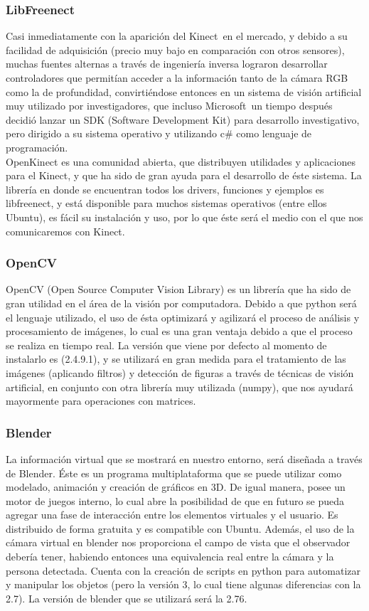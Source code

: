 \documentclass[a4paper,openright,12pt]{report}
\begin{document}
\subsubsection{LibFreenect}
Casi inmediatamente con la aparición del Kinect\textcopyright\ en el mercado, y debido a su facilidad de adquisición (precio muy bajo en comparación con otros sensores), muchas fuentes alternas a través de ingeniería inversa lograron desarrollar controladores que permitían acceder a la información tanto de la cámara RGB como la de profundidad, convirtiéndose entonces en un sistema de visión artificial muy utilizado por investigadores, que incluso Microsoft\textregistered\ un tiempo después decidió lanzar un SDK (Software Development Kit) para desarrollo investigativo, pero dirigido a su sistema operativo y utilizando c\# como lenguaje de programación.\\
OpenKinect es una comunidad abierta, que distribuyen utilidades y aplicaciones para el Kinect\textcopyright, y que ha sido de gran ayuda para el desarrollo de éste sistema. La librería en donde se encuentran todos los drivers, funciones y ejemplos es libfreenect, y está disponible para muchos sistemas operativos (entre ellos Ubuntu), es fácil su instalación y uso, por lo que éste será el medio con el que nos comunicaremos con Kinect\textcopyright.
\subsubsection{OpenCV}
OpenCV (Open Source Computer Vision Library) es un librería que ha sido de gran utilidad en el área de la visión por computadora. Debido a que python será el lenguaje utilizado, el uso de ésta optimizará y agilizará el proceso de análisis y procesamiento de imágenes, lo cual es una gran ventaja debido a que el proceso se realiza en tiempo real. La versión que viene por defecto al momento de instalarlo es (2.4.9.1), y se utilizará en gran medida para el tratamiento de las imágenes (aplicando filtros) y detección de figuras a través de técnicas de visión artificial, en conjunto con otra librería muy utilizada (numpy), que nos ayudará mayormente para operaciones con matrices.
\subsubsection{Blender}
La información virtual que se mostrará en nuestro entorno, será diseñada a través de Blender. Éste es un programa multiplataforma que se puede utilizar como modelado, animación y creación de gráficos en 3D. De igual manera, posee un motor de juegos interno, lo cual abre la posibilidad de que en futuro se pueda agregar una fase de interacción entre los elementos virtuales y el usuario. Es distribuido de forma gratuita y es compatible con Ubuntu. Además, el uso de la cámara virtual en blender nos proporciona el campo de vista que el observador debería tener, habiendo entonces una equivalencia real entre la cámara y la persona detectada. Cuenta con la creación de scripts en python para automatizar y manipular los objetos (pero la versión 3, lo cual tiene algunas diferencias con la 2.7). La versión de blender que se utilizará será la 2.76.
\end{document}
